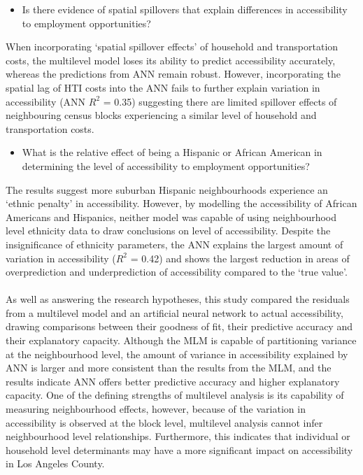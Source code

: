 \documentclass[a4paper,UKenglish]{lipics-v2018}
\begin{document}
\begin{itemize}
        \item Is there evidence of spatial spillovers that explain differences in accessibility to employment opportunities?
\end{itemize} 
When incorporating ‘spatial spillover effects’ of household and transportation costs, the multilevel model loses its ability to predict accessibility accurately, whereas the predictions from ANN remain robust. However, incorporating the spatial lag of HTI costs into the ANN fails to further explain variation in accessibility (ANN $R^2$ = 0.35) suggesting there are limited spillover effects of neighbouring census blocks experiencing a similar level of household and transportation costs.

\begin{itemize}
        \item What is the relative effect of being a Hispanic or African American in determining the level of accessibility to employment opportunities?
\end{itemize} 
The results suggest more suburban Hispanic neighbourhoods experience an ‘ethnic penalty’ in accessibility. However, by modelling the accessibility of African Americans and Hispanics, neither model was capable of using neighbourhood level ethnicity data to draw conclusions on level of accessibility. Despite the insignificance of ethnicity parameters, the ANN explains the largest amount of variation in accessibility ($R^2$ = 0.42) and shows the largest reduction in areas of overprediction and underprediction of accessibility compared to the ‘true value’. 
\\\\
As well as answering the research hypotheses, this study compared the residuals from a multilevel model and an artificial neural network to actual accessibility, drawing comparisons between their goodness of fit, their predictive accuracy and their explanatory capacity. Although the MLM is capable of partitioning variance at the neighbourhood level, the amount of variance in accessibility explained by ANN is larger and more consistent than the results from the MLM, and the results indicate ANN offers better predictive accuracy and higher explanatory capacity. One of the defining strengths of multilevel analysis is its capability of measuring neighbourhood effects, however, because of the variation in accessibility is observed at the block level, multilevel analysis cannot infer neighbourhood level relationships. Furthermore, this indicates that individual or household level determinants may have a more significant impact on accessibility in Los Angeles County. 
\end{document}

